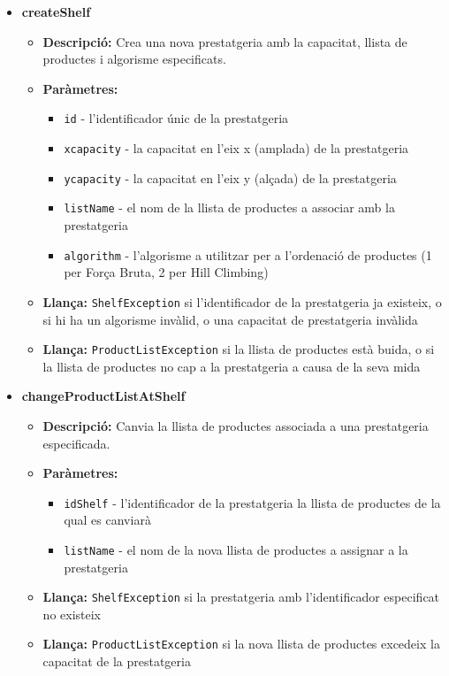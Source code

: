 \documentclass[a4paper, t]{article}
\begin{document}
\begin{itemize}
    \item \textbf{createShelf}
    \begin{itemize}
        \item \textbf{Descripció:} Crea una nova prestatgeria amb la capacitat, llista de productes i algorisme especificats.
        \item \textbf{Paràmetres:}
        \begin{itemize}
            \item \texttt{id} - l'identificador únic de la prestatgeria
            \item \texttt{xcapacity} - la capacitat en l'eix x (amplada) de la prestatgeria
            \item \texttt{ycapacity} - la capacitat en l'eix y (alçada) de la prestatgeria
            \item \texttt{listName} - el nom de la llista de productes a associar amb la prestatgeria
            \item \texttt{algorithm} - l'algorisme a utilitzar per a l'ordenació de productes (1 per Força Bruta, 2 per Hill Climbing)
        \end{itemize}
        \item \textbf{Llança:} \texttt{ShelfException} si l'identificador de la prestatgeria ja existeix, o si hi ha un algorisme invàlid, o una capacitat de prestatgeria invàlida
        \item \textbf{Llança:} \texttt{ProductListException} si la llista de productes està buida, o si la llista de productes no cap a la prestatgeria a causa de la seva mida
    \end{itemize}

    \item \textbf{changeProductListAtShelf}
    \begin{itemize}
        \item \textbf{Descripció:} Canvia la llista de productes associada a una prestatgeria especificada.
        \item \textbf{Paràmetres:}
        \begin{itemize}
            \item \texttt{idShelf} - l'identificador de la prestatgeria la llista de productes de la qual es canviarà
            \item \texttt{listName} - el nom de la nova llista de productes a assignar a la prestatgeria
        \end{itemize}
        \item \textbf{Llança:} \texttt{ShelfException} si la prestatgeria amb l'identificador especificat no existeix
        \item \textbf{Llança:} \texttt{ProductListException} si la nova llista de productes excedeix la capacitat de la prestatgeria
    \end{itemize}


\end{itemize}
\end{document}
